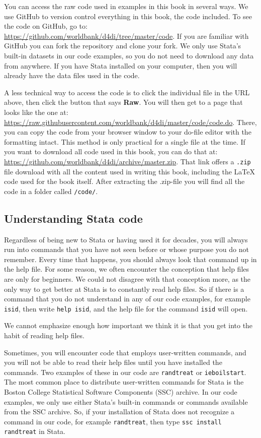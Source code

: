 You can access the raw code used in examples in this book in several ways.
We use GitHub to version control everything in this book, the code included.
To see the code on GitHub, go to: \url{https://github.com/worldbank/d4di/tree/master/code}.
If you are familiar with GitHub you can fork the repository and clone your fork.
We only use Stata's built-in datasets in our code examples,
so you do not need to download any data from anywhere.
If you have Stata installed on your computer, then you will already have the data files used in the code.

A less technical way to access the code is to click the individual file in the URL above, then click
the button that says \textbf{Raw}. You will then get to a page that looks like the one at:
\url{https://raw.githubusercontent.com/worldbank/d4di/master/code/code.do}.
There, you can copy the code from your browser window to your do-file editor with the formatting intact.
This method is only practical for a single file at the time.
If you want to download all code used in this book, you can do that at:
\url{https://github.com/worldbank/d4di/archive/master.zip}. That link offers a \texttt{.zip} file download
with all the content used in writing this book, including the \LaTeX{} code used for the book itself. After
extracting the .zip-file you will find all the code in a folder called \texttt{/code/}.

\subsection{Understanding Stata code}

Regardless of being new to Stata or having used it for decades, you will always run into commands that
you have not seen before or whose purpose you do not remember.
Every time that happens, you should always look that command up in the help file.
For some reason, we often encounter the conception that help files are only for beginners.
We could not disagree with that conception more,
as the only way to get better at Stata is to constantly read help files.
So if there is a command that you do not understand in any of our code examples,
for example \texttt{isid}, then write \texttt{help isid},
and the help file for the command \texttt{isid} will open.

We cannot emphasize enough how important we think it is that you get into the habit of reading help files.

Sometimes, you will encounter code that employs user-written commands,
and you will not be able to read their help files until you have installed the commands.
Two examples of these in our code are \texttt{randtreat} or \texttt{ieboilstart}.
The most common place to distribute user-written commands for Stata
is the Boston College Statistical Software Components (SSC) archive.
In our code examples, we only use either Stata's built-in commands or commands available from the
SSC archive.
So, if your installation of Stata does not recognize a command in our code, for example
\texttt{randtreat}, then type \texttt{ssc install randtreat} in Stata.


